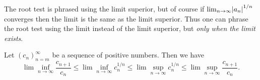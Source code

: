 \begin{note}
    The root test is phrased using the limit superior, but of course if \(\lim_{n \to \infty} \abs*{a_n}^{1 / n}\) converges then the limit is the same as the limit superior.
    Thus one can phrase the root test using the limit instead of the limit superior, but \emph{only when the limit exists}.
\end{note}

\begin{lemma}\label{7.5.2}
    Let \((c_n)_{n = m}^\infty\) be a sequence of positive numbers.
    Then we have
    \[
        \lim\inf_{n \to \infty} \frac{c_{n + 1}}{c_n} \leq \lim\inf_{n \to \infty} c_n^{1 / n} \leq \lim\sup_{n \to \infty} c_n^{1 / n} \leq \lim\sup_{n \to \infty} \frac{c_{n + 1}}{c_n}.
    \]
\end{lemma}

